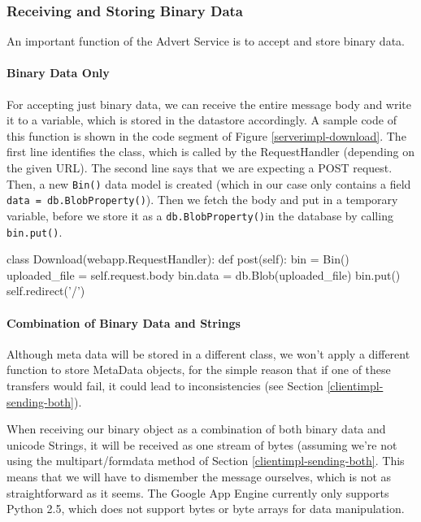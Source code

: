 \subsubsection{Receiving and Storing Binary Data}
An important function of the Advert Service is to accept and store binary data.

\paragraph{Binary Data Only}
For accepting just binary data, we can receive the entire message body and write
it to a variable, which is stored in the datastore accordingly. A sample code of
this function is shown in the code segment of Figure \ref{serverimpl-download}.
The first line identifies the class, which is called by the RequestHandler
(depending on the given URL). The second line says that we are expecting a POST
request. Then, a new \texttt{Bin()} data model is created (which in our case only
contains a field \texttt{data = db.BlobProperty()}). Then we fetch the body and
put in a temporary variable, before we store it as a \texttt{db.BlobProperty()}in
the database by calling \texttt{bin.put()}.

\begin{figure*}[ht] %
\begin{center}
\begin{code}
class Download(webapp.RequestHandler):
  def post(self):
    bin = Bin()
    uploaded_file = self.request.body
    bin.data = db.Blob(uploaded_file)
    bin.put()
    self.redirect('/')
\end{code}
\caption{Accepting Binary Data.\label{serverimpl-download}}
\end{center}
\end{figure*}
      
\paragraph{Combination of Binary Data and Strings}
Although meta data will be stored in a different class, we won't apply a
different function to store MetaData objects, for the simple reason that if one
of these transfers would fail, it could lead to inconsistencies (see Section
\ref{clientimpl-sending-both}).

When receiving our binary object as a combination of both binary data and
unicode Strings, it will be received as one stream of bytes (assuming we're not
using the multipart/formdata method of Section \ref{clientimpl-sending-both}.
This means that we will have to dismember the message ourselves, which is
not as straightforward as it seems. The Google App Engine currently only
supports Python 2.5, which does not support bytes or byte arrays for data
manipulation.

